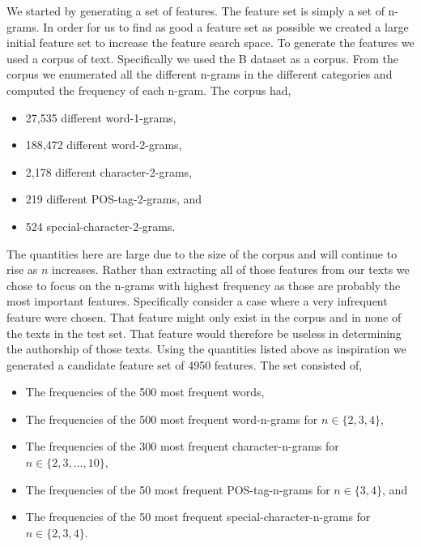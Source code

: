 We started by generating a set of features. The feature set is simply a set of
n-grams. In order for us to find as good a feature set as possible we created a
large initial feature set to increase the feature search space. To generate the
features we used a corpus of text. Specifically we used the \gls{B} dataset as a
corpus. From the corpus we enumerated all the different n-grams in the different
categories and computed the frequency of each n-gram. The corpus had,

\begin{itemize}
    \item 27,535 different word-1-grams,
    \item 188,472 different word-2-grams,
    \item 2,178 different character-2-grams,
    \item 219 different \gls{POS}-tag-2-grams, and
    \item 524 special-character-2-grams.
\end{itemize}

The quantities here are large due to the size of the corpus and will continue
to rise as $n$ increases. Rather than extracting all of those features from
our texts we chose to focus on the n-grams with highest frequency as those are
probably the most important features. Specifically consider a case where a very
infrequent feature were chosen. That feature might only exist in the corpus and
in none of the texts in the test set. That feature would therefore be useless
in determining the authorship of those texts. Using the quantities listed above
as inspiration we generated a candidate feature set of 4950 features. The set
consisted of,

\begin{itemize}
    \item

        The frequencies of the 500 most frequent words,

    \item

        The frequencies of the 500 most frequent word-n-grams for $n \in \{2, 3,
        4\}$,

    \item

        The frequencies of the 300 most frequent character-n-grams for $n \in
        \{2, 3, ..., 10\}$,

    \item

        The frequencies of the 50 most frequent \gls{POS}-tag-n-grams for $n \in
        \{3, 4\}$, and

    \item

        The frequencies of the 50 most frequent special-character-n-grams for $n
        \in \{2, 3, 4\}$.

\end{itemize}

